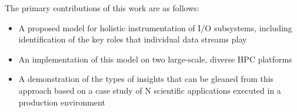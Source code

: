
 The primary contributions of this work are as follows:

\begin{itemize}
\item A proposed model for holistic instrumentation of I/O subsystems, including identification of the key roles that individual data streams play
\item An implementation of this model on two large-scale, diverse HPC platforms
\item A demonstration of the types of insights that can be gleaned from this approach based on a case study of N scientific applications executed in a production environment
\end{itemize}

